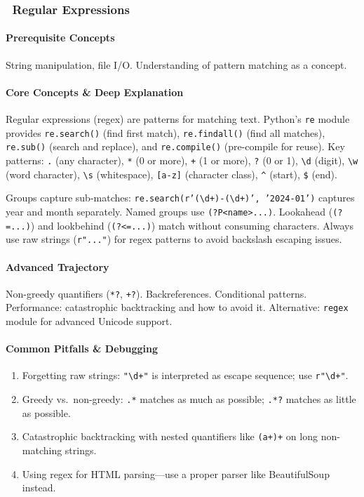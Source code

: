 \documentclass[11pt, a4paper, oneside]{report}
\newcommand{\mustmaster}[1]{\subsubsection{\texorpdfstring{\fcolorbox{blue!40!black}{blue!8}{\footnotesize\bfseries\color{blue!40!black} MUST MASTER}~#1}{#1}}}
\begin{document}
\mustmaster{Regular Expressions}

\paragraph{Prerequisite Concepts} String manipulation, file I/O. Understanding of pattern matching as a concept.

\paragraph{Core Concepts \& Deep Explanation} Regular expressions (regex) are patterns for matching text. Python's \texttt{re} module provides \texttt{re.search()} (find first match), \texttt{re.findall()} (find all matches), \texttt{re.sub()} (search and replace), and \texttt{re.compile()} (pre-compile for reuse). Key patterns: \texttt{.} (any character), \texttt{*} (0 or more), \texttt{+} (1 or more), \texttt{?} (0 or 1), \texttt{\textbackslash d} (digit), \texttt{\textbackslash w} (word character), \texttt{\textbackslash s} (whitespace), \texttt{[a-z]} (character class), \texttt{\^{}} (start), \texttt{\$} (end).

Groups capture sub-matches: \texttt{re.search(r'(\textbackslash d+)-(\textbackslash d+)', '2024-01')} captures year and month separately. Named groups use \texttt{(?P<name>...)}. Lookahead (\texttt{(?=...)}) and lookbehind (\texttt{(?<=...)}) match without consuming characters. Always use raw strings (\texttt{r"..."}) for regex patterns to avoid backslash escaping issues.

\paragraph{Advanced Trajectory} Non-greedy quantifiers (\texttt{*?}, \texttt{+?}). Backreferences. Conditional patterns. Performance: catastrophic backtracking and how to avoid it. Alternative: \texttt{regex} module for advanced Unicode support.

\paragraph{Common Pitfalls \& Debugging}
\begin{enumerate}[leftmargin=*]
\item Forgetting raw strings: \texttt{"\textbackslash d+"} is interpreted as escape sequence; use \texttt{r"\textbackslash d+"}.
\item Greedy vs.\ non-greedy: \texttt{.*} matches as much as possible; \texttt{.*?} matches as little as possible.
\item Catastrophic backtracking with nested quantifiers like \texttt{(a+)+} on long non-matching strings.
\item Using regex for HTML parsing---use a proper parser like BeautifulSoup instead.
\end{enumerate}
\end{document}

